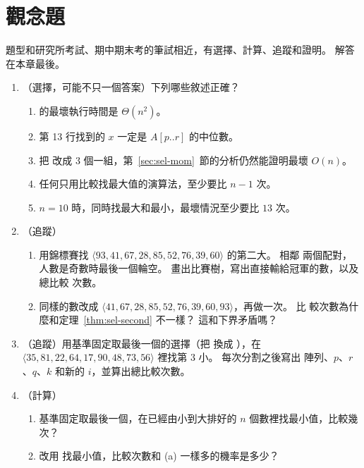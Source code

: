 \section{觀念題}
\label{sec:sel-exercises}

題型和研究所考試、期中期末考的筆試相近，有選擇、計算、追蹤和證明。 解答在本章最後。

\begin{enumerate}
\item \label{sel-q-tf}（選擇，可能不只一個答案）下列哪些敘述正確？
\begin{enumerate}
\item {} 的最壞執行時間是 $\Theta(n^2)$。
\item {} 第 13 行找到的 $x$ 一定是 $A[p..r]$ 的中位數。
\item 把  改成 $3$ 個一組，第~\ref{sec:sel-mom}~節的分析仍然能證明最壞
$O(n)$。
\item 任何只用比較找最大值的演算法，至少要比 $n - 1$ 次。
\item $n = 10$ 時，同時找最大和最小，最壞情況至少要比 $13$ 次。
\end{enumerate}

\item \label{sel-q-tour}（追蹤）
\begin{enumerate}
\item 用錦標賽找 $\langle 93, 41, 67, 28, 85, 52, 76, 39, 60 \rangle$ 的第二大。 相鄰
兩個配對，人數是奇數時最後一個輪空。 畫出比賽樹，寫出直接輸給冠軍的數，以及總比較
次數。
\item 同樣的數改成 $\langle 41, 67, 28, 85, 52, 76, 39, 60, 93 \rangle$，再做一次。 比
較次數為什麼和定理~\ref{thm:sel-second} 不一樣？ 這和下界矛盾嗎？
\end{enumerate}

\item \label{sel-q-trace}（追蹤）用基準固定取最後一個的選擇（把
 換成 ），在
$\langle 35, 81, 22, 64, 17, 90, 48, 73, 56 \rangle$ 裡找第 $3$ 小。 每次分割之後寫出
陣列、$p$、$r$、$q$、$k$ 和新的 $i$，並算出總比較次數。

\item \label{sel-q-worst}（計算）
\begin{enumerate}
\item 基準固定取最後一個，在已經由小到大排好的 $n$ 個數裡找最小值，比較幾次？
\item 改用  找最小值，比較次數和 (a) 一樣多的機率是多少？
\end{enumerate}


\end{enumerate}
